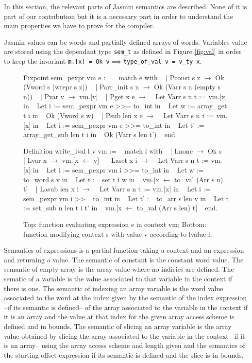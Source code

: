 \documentclass{article}
\begin{document}
In this section, the relevant parts of Jasmin semantics are described. None of
it is part of our contribution but it is a necessary part in order to understand
the main properties we have to prove for the compiler.

Jasmin values can be words and partially defined arrays of words. Variables value
are stored using the dependant type \texttt{sem\_t} as defined in Figure
\ref{fig:val} in order to keep the invariant
\texttt{m.[x] = Ok v\(\implies\)type\_of\_val v = v\_ty x}.

\medskip

\begin{figure}[!t]
\obeylines\obeyspaces\ttfamily%
Fixpoint sem\_pexpr vm e :=
~ match e with
~ | Pconst s z \(\rightarrow\) Ok (Vword s (wrepr s z))
~ | Parr\_init s n \(\rightarrow\) Ok (Varr s n (empty s n))
~ | Pvar v \(\rightarrow\) vm.[v]
~ | Pget x e \(\rightarrow\)
~   Let Varr s n t := vm.[x] in
~   Let i := sem\_pexpr vm e >{}>= to\_int in
~   Let w := array\_get t i in
~   Ok (Vword s w)
~ | Psub len x e \(\rightarrow\)
~   Let Varr s n t := vm.[x] in
~   Let i := sem\_pexpr vm e >{}>= to\_int in
~   Let t' := array\_get\_sub len t i in
~   Ok (Varr s len t')
~ end.

Definition write\_lval l v vm :=
~ match l with
~ | Lnone \(\rightarrow\) Ok s
~ | Lvar x \(\rightarrow\) vm.[x \(\leftarrow\) v]
~ | Laset x i \(\rightarrow\)
~   Let Varr s n t := vm.[x] in
~   Let i := sem\_pexpr vm i >{}>= to\_int in
~   Let w := to\_word s v in
~   Let t := set t i w in
~   vm.[x \(\leftarrow\) to\_val (Arr s n) t]
~ | Lasub len x i \(\rightarrow\)
~   Let Varr s n t := vm.[x] in
~   Let i := sem\_pexpr vm i >{}>= to\_int in
~   Let t' := to\_arr s len v in 
~   Let t := set\_sub n len t i t' in
~   vm.[x \(\leftarrow\) to\_val (Arr s len) t]
~ end.
\normalfont%
\caption{Top: function evaluating expression e in context vm; %
Bottom: function modifying context s with value v according to lvalue l.}
\end{figure}

Semantics of expressions is a partial function taking a context and an
expression and returning a value.
The semantic of constant is the constant word value. The semantic of empty array
is the array value where no indicies are defined. The sematic of a variable is
the value associated to that variable in the context if there is one. The
semantic of indexing an array variable is the word value associated to the word
at the index given by the semantic of the index expression --if its semantic
is defined-- of the array associated to the variable in the context if it is an
array and the value at that index for the given array access scheme is defined
and in bounds. The semantic of slicing an array variable is the array value
obtained by slicing the array associated to the variable in the context --if it
is an array-- using the array access scheme and length given and the semantics
of the starting offset expression if its semantic is defined and the slice is in
bounds.
\end{document}
